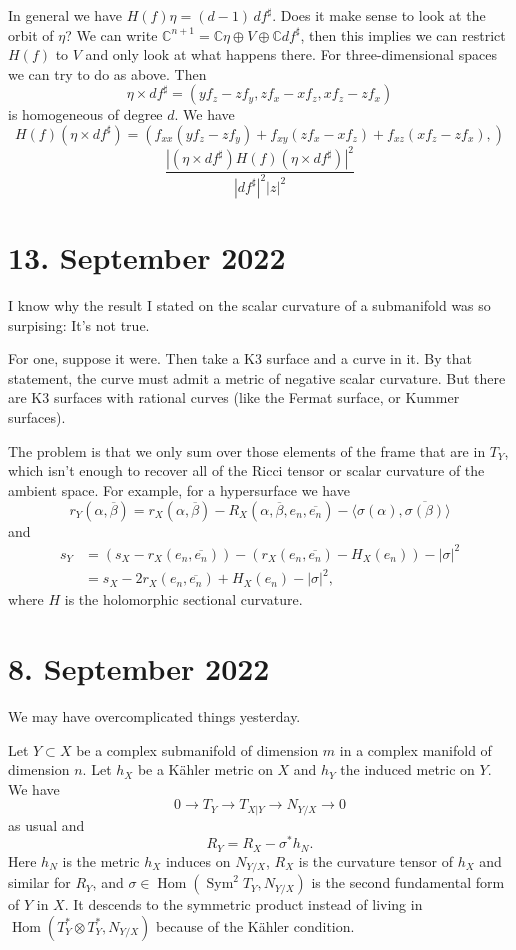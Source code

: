 \documentclass[11pt]{article}
\theoremstyle{definition}
\newcommand{\kk}[1]{\mathbb{#1}}
\def\ov#1{\overline{#1}}
\DeclareMathOperator{\Hom}{Hom}
\begin{document}
In general we have $H(f) \eta = (d-1) \, df^{\sharp}$.
Does it make sense to look at the orbit of $\eta$?
We can write $\kk C^{n+1} = \kk C \eta \oplus V \oplus \kk C df^{\sharp}$, then this implies we can restrict $H(f)$ to $V$ and only look at what happens there.
For three-dimensional spaces we can try to do as above.
Then
\[
  \eta \times df^{\sharp}
  = (
  y f_{z} - z f_{y},
  z f_{x} - x f_{z},
  x f_{z} - z f_{x}
  )
\]
is homogeneous of degree $d$.
We have
\[
  H(f)(\eta \times df^{\sharp})
  = (
  f_{xx}(yf_{z} - zf_{y})
  + f_{xy}(zf_{x} - xf_{z})
  + f_{xz}(xf_{z} - zf_{x}),
  )
\]
\[
  \frac{
    |(\eta \times df^{\sharp})
    H(f)
    (\eta \times df^{\sharp})|^{2}
  }{|df^{\sharp}|^{2}|z|^{2}}
\]


\section{13. September 2022}

I know why the result I stated on the scalar curvature of a submanifold was so
surpising: It's not true.

For one, suppose it were. Then take a K3 surface and a curve in it. By that
statement, the curve must admit a metric of negative scalar curvature. But there
are K3 surfaces with rational curves (like the Fermat surface, or Kummer
surfaces).

The problem is that we only sum over those elements of the frame that are in
$T_Y$, which isn't enough to recover all of the Ricci tensor or scalar curvature
of the ambient space. For example, for a hypersurface we have
\[
r_Y(\alpha, \ov\beta)
= r_X(\alpha, \ov\beta)
- R_X(\alpha, \ov\beta, e_n, \ov{e_n})
- \langle \sigma(\alpha), \ov{\sigma(\beta)} \rangle
\]
and
\begin{align*}
s_Y
&= (s_X - r_X(e_n, \ov{e_n}))
- (r_X(e_n, \ov{e_n}) - H_X(e_n))
- |\sigma|^2
\\
&= s_X - 2 r_X(e_n, \ov{e_n}) + H_X(e_n) - |\sigma|^2,
\end{align*}
where $H$ is the holomorphic sectional curvature.

\section{8. September 2022}

We may have overcomplicated things yesterday.

Let $Y \subset X$ be a complex submanifold of dimension $m$ in a complex
manifold of dimension $n$.
Let $h_X$ be a K\"ahler metric on $X$ and $h_Y$ the induced metric on $Y$.
We have
$$
0 \to T_Y \to T_{X|Y} \to N_{Y/X} \to 0
$$
as usual and
$$
R_Y = R_X - \sigma^* h_N.
$$
Here $h_N$ is the metric $h_X$ induces on $N_{Y/X}$, $R_X$ is the curvature
tensor of $h_X$ and similar for $R_Y$, and $\sigma \in \Hom(\operatorname{Sym}^2
T_Y, N_{Y/X})$ is the second fundamental form of $Y$ in $X$. It descends to the
symmetric product instead of living in $\Hom(T_Y^* \otimes T_Y^*, N_{Y/X})$
because of the K\"ahler condition.
\end{document}
